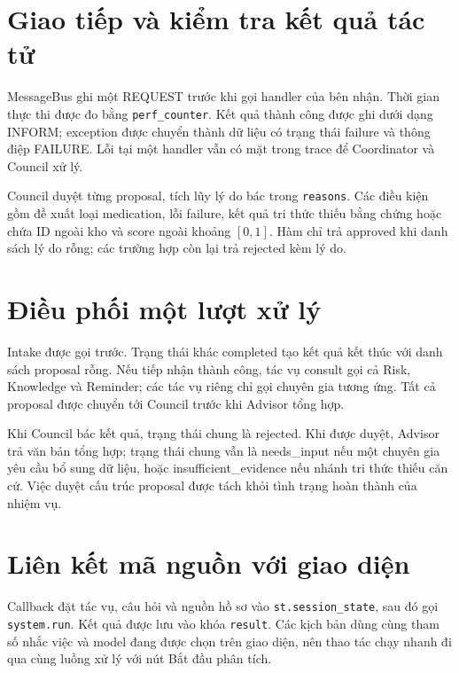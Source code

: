\section{Giao tiếp và kiểm tra kết quả tác tử}

MessageBus ghi một REQUEST trước khi gọi handler của bên nhận. Thời gian thực thi được đo bằng \texttt{perf\_counter}. Kết quả thành công được ghi dưới dạng INFORM; exception được chuyển thành dữ liệu có trạng thái failure và thông điệp FAILURE. Lỗi tại một handler vẫn có mặt trong trace để Coordinator và Council xử lý.


Council duyệt từng proposal, tích lũy lý do bác trong \texttt{reasons}. Các điều kiện gồm đề xuất loại medication, lỗi failure, kết quả tri thức thiếu bằng chứng hoặc chứa ID ngoài kho và score ngoài khoảng $[0,1]$. Hàm chỉ trả approved khi danh sách lý do rỗng; các trường hợp còn lại trả rejected kèm lý do.

\section{Điều phối một lượt xử lý}

Intake được gọi trước. Trạng thái khác completed tạo kết quả kết thúc với danh sách proposal rỗng. Nếu tiếp nhận thành công, tác vụ consult gọi cả Risk, Knowledge và Reminder; các tác vụ riêng chỉ gọi chuyên gia tương ứng. Tất cả proposal được chuyển tới Council trước khi Advisor tổng hợp.

Khi Council bác kết quả, trạng thái chung là rejected. Khi được duyệt, Advisor trả văn bản tổng hợp; trạng thái chung vẫn là needs\_input nếu một chuyên gia yêu cầu bổ sung dữ liệu, hoặc insufficient\_evidence nếu nhánh tri thức thiếu căn cứ. Việc duyệt cấu trúc proposal được tách khỏi tình trạng hoàn thành của nhiệm vụ.

\section{Liên kết mã nguồn với giao diện}

Callback đặt tác vụ, câu hỏi và nguồn hồ sơ vào \texttt{st.session\_state}, sau đó gọi \texttt{system.run}. Kết quả được lưu vào khóa \texttt{result}. Các kịch bản dùng cùng tham số nhắc việc và model đang được chọn trên giao diện, nên thao tác chạy nhanh đi qua cùng luồng xử lý với nút Bắt đầu phân tích.

